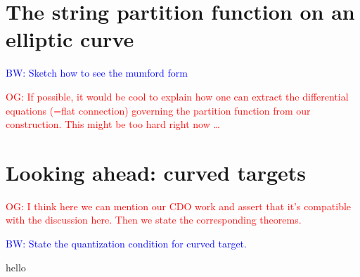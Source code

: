 \documentclass[10pt]{amsart}
\def\brian{\textcolor{blue}{BW: }\textcolor{blue}}
\def\owen{\textcolor{red}{OG: }\textcolor{red}}
\begin{document}
\section{The string partition function on an elliptic curve}

\brian{Sketch how to see the mumford form}

\owen{If possible, it would be cool to explain how one can extract the differential equations (=flat connection) governing the partition function from our construction. This might be too hard right now \dots}

\section{Looking ahead: curved targets}

\owen{I think here we can mention our CDO work and assert that it's compatible with the discussion here. Then we state the corresponding theorems.}

\brian{State the quantization condition for curved target.} 

hello
\end{document}
